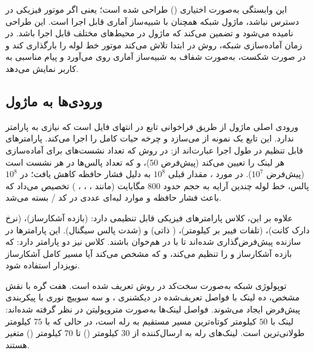 این وابستگی به‌صورت اختیاری () طراحی شده است؛ یعنی اگر موتور فیزیکی در دسترس نباشد، ماژول شبکه همچنان با شبیه‌ساز آماری قابل اجرا است. این طراحی  نامیده می‌شود و تضمین می‌کند که ماژول در محیط‌های مختلف قابل اجرا باشد. در زمان آماده‌سازی شبکه، روش  در  ابتدا تلاش می‌کند موتور خط لوله را بارگذاری کند و در صورت شکست، به‌صورت شفاف به شبیه‌ساز آماری روی می‌آورد و پیام مناسبی به کاربر نمایش می‌دهد.

\subsection{ورودی‌ها به ماژول}

ورودی اصلی ماژول از طریق فراخوانی تابع  در انتهای فایل است که نیازی به پارامتر ندارد. این تابع یک نمونه از  می‌سازد و چرخه حیات کامل را اجرا می‌کند. پارامترهای قابل تنظیم در طول اجرا عبارت‌اند از:  در روش  که تعداد نشست‌های  برای آماده‌سازی هر لینک را تعیین می‌کند (پیش‌فرض $50$)، و  که تعداد پالس‌ها در هر نشست است (پیش‌فرض $10^7$). در مورد ، مقدار قبلی $10^8$ به دلیل فشار حافظه کاهش یافت؛ در $10^8$ پالس، خط لوله چندین آرایه  به حجم حدود $800$ مگابایت (مانند ، ، ، ) تخصیص می‌داد که باعث فشار حافظه و موارد لبه‌ای عددی در کد / بسته  می‌شد.

علاوه بر این، کلاس  پارامترهای فیزیکی قابل تنظیمی دارد:  (بازده آشکارساز)،  (نرخ دارک کانت)،  (تلفات فیبر بر کیلومتر)،  ( ذاتی) و  (شدت پالس سیگنال). این پارامترها در سازنده پیش‌فرض‌گذاری شده‌اند تا با  در  هم‌خوان باشند. کلاس  نیز دو پارامتر دارد:  که بازده آشکارساز  و  را تنظیم می‌کند، و  که مشخص می‌کند آیا مسیر کامل آشکارساز نویزدار استفاده شود.

توپولوژی شبکه به‌صورت سخت‌کد در روش  تعریف شده است. هفت گره با نقش مشخص، ده لینک با فواصل تعریف‌شده در دیکشنری ، و سه سوییچ نوری با پیکربندی پیش‌فرض ایجاد می‌شوند. فواصل لینک‌ها به‌صورت متروپولیتن در نظر گرفته شده‌اند: لینک  با $50$ کیلومتر کوتاه‌ترین مسیر مستقیم به رله است، در حالی که  با $75$ کیلومتر طولانی‌ترین است. لینک‌های رله به ارسال‌کننده از $30$ کیلومتر () تا $70$ کیلومتر () متغیر هستند.

